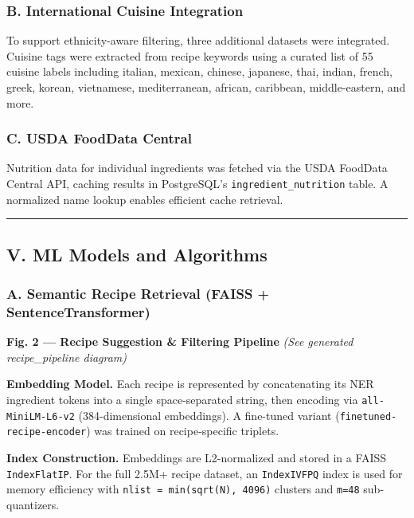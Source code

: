 \documentclass[10pt,conference,compsoc]{IEEEtran}
\begin{document}
\subsubsection{B. International Cuisine
Integration}\label{b.-international-cuisine-integration}

To support ethnicity-aware filtering, three additional datasets were
integrated. Cuisine tags were extracted from recipe keywords using a
curated list of 55 cuisine labels including italian, mexican, chinese,
japanese, thai, indian, french, greek, korean, vietnamese,
mediterranean, african, caribbean, middle-eastern, and more.

\subsubsection{C. USDA FoodData Central}\label{c.-usda-fooddata-central}

Nutrition data for individual ingredients was fetched via the USDA
FoodData Central API, caching results in PostgreSQL's
\texttt{ingredient\_nutrition} table. A normalized name lookup enables
efficient cache retrieval.

\begin{center}\rule{0.5\linewidth}{0.5pt}\end{center}

\subsection{V. ML Models and
Algorithms}\label{v.-ml-models-and-algorithms}

\subsubsection{A. Semantic Recipe Retrieval (FAISS +
SentenceTransformer)}\label{a.-semantic-recipe-retrieval-faiss-sentencetransformer}

\textbf{Fig. 2 --- Recipe Suggestion \& Filtering Pipeline} \emph{(See
generated recipe\_pipeline diagram)}

\textbf{Embedding Model.} Each recipe is represented by concatenating
its NER ingredient tokens into a single space-separated string, then
encoding via \texttt{all-MiniLM-L6-v2} (384-dimensional embeddings). A
fine-tuned variant (\texttt{finetuned-recipe-encoder}) was trained on
recipe-specific triplets.

\textbf{Index Construction.} Embeddings are L2-normalized and stored in
a FAISS \texttt{IndexFlatIP}. For the full 2.5M+ recipe dataset, an
\texttt{IndexIVFPQ} index is used for memory efficiency with
\texttt{nlist\ =\ min(sqrt(N),\ 4096)} clusters and \texttt{m=48}
sub-quantizers.
\end{document}
